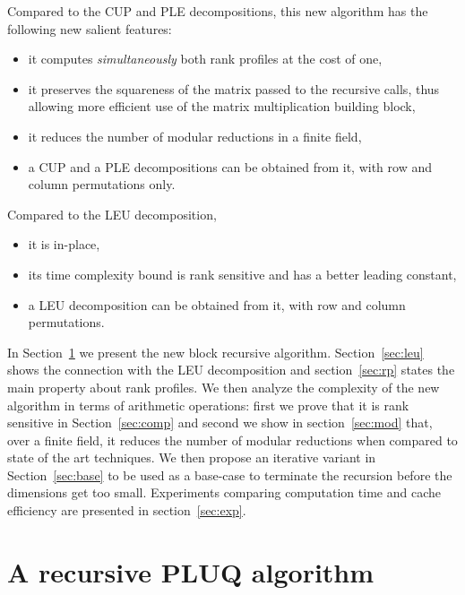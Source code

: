 \documentclass{article}
\newcommand{\strechparskip}[1]{}
\newcommand{\strechparsep}[1]{}
\newcommand{\customvspace}[1]{}
\begin{document}
Compared to the CUP and PLE decompositions, this new algorithm has the following
new salient features: 
\customvspace{-1em}
 \begin{itemize}
\strechparskip{-3pt}
\strechparsep{-6pt}
 \item it computes {\em simultaneously} both rank profiles at the cost of one,
 \item it preserves the squareness of the matrix passed to the recursive calls,
  thus allowing more efficient use of the matrix multiplication building block,
\item it reduces the number of modular reductions in a finite field,
\item a CUP and a PLE decompositions can be obtained from it, with row and
  column permutations only.
 \end{itemize} 
\customvspace{-1em}
Compared to the LEU decomposition, 
\customvspace{-1em}
\begin{itemize}
\strechparskip{-3pt}
\strechparsep{-6pt}
\item it is in-place,
\item its time complexity bound is rank sensitive and has a better leading constant,
\item a LEU decomposition can be obtained from it, with row and column
  permutations.
\end{itemize}
\customvspace{-1em}


In Section~\ref{sec:rec} we present the new block recursive algorithm. 
Section~\ref{sec:leu} shows the connection with the LEU
decomposition and section~\ref{sec:rp} states the main property about
rank profiles.
We then analyze the complexity of the new algorithm in terms
of arithmetic operations: first we prove that it is rank
sensitive in Section~\ref{sec:comp} and second we show in
section~\ref{sec:mod} that, over a finite field, it reduces the number of
modular reductions when compared to state of the art techniques.
We then propose an iterative variant in Section~\ref{sec:base} to be
used as a base-case to terminate the recursion before the dimensions get too
small. Experiments comparing computation time and cache efficiency are presented
in section~\ref{sec:exp}.


\section{A recursive PLUQ algorithm}\label{sec:rec}
\end{document}
